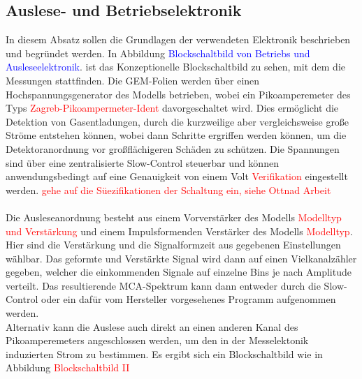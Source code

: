 		\subsection{Auslese- und Betriebselektronik}
		In diesem Absatz sollen die Grundlagen der verwendeten Elektronik beschrieben und begründet werden. In Abbildung \textcolor{blue}{Blockschaltbild von Betriebs und Ausleseelektronik}. ist das Konzeptionelle Blockschaltbild zu sehen, mit dem die Messungen stattfinden. Die GEM-Folien werden über einen Hochspannungsgenerator des Modells betrieben, wobei ein Pikoamperemeter des Typs \textcolor{red}{Zagreb-Pikoampermeter-Ident} davorgeschaltet wird. Dies ermöglicht die Detektion von Gasentladungen, durch die kurzweilige aber vergleichsweise große Ströme entstehen können, wobei dann Schritte ergriffen werden können, um die Detektoranordnung vor großflächigeren Schäden zu schützen. Die Spannungen sind über eine zentralisierte Slow-Control steuerbar und können anwendungsbedingt auf eine Genauigkeit von einem Volt \textcolor{red}{Verifikation} eingestellt werden. \textcolor{red}{gehe auf die Süezifikationen der Schaltung ein, siehe Ottnad Arbeit} \\
		\\
		Die Ausleseanordnung besteht aus einem Vorverstärker des Modells \textcolor{red}{Modelltyp und Verstärkung} und einem Impulsformenden Verstärker des Modells \textcolor{red}{Modelltyp}. Hier sind die Verstärkung und die Signalformzeit aus gegebenen Einstellungen wählbar. Das geformte und Verstärkte Signal wird dann auf einen Vielkanalzähler gegeben, welcher die einkommenden Signale auf einzelne Bins je nach Amplitude verteilt. Das resultierende MCA-Spektrum kann dann entweder durch die Slow-Control oder ein dafür vom Hersteller vorgesehenes Programm aufgenommen werden.\\
		Alternativ kann die Auslese auch direkt an einen anderen Kanal des Pikoamperemeters angeschlossen werden, um den in der Messelektonik induzierten Strom zu bestimmen. Es ergibt sich ein Blockschaltbild wie in Abbildung \textcolor{red}{Blockschaltbild II}  
		

